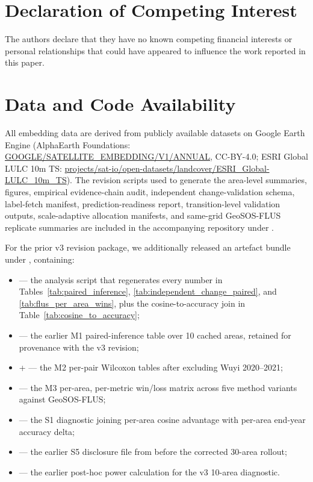 \documentclass{article}
\begin{document}
\section*{Declaration of Competing Interest}
The authors declare that they have no known competing financial interests or personal relationships that could have appeared to influence the work reported in this paper.

\section*{Data and Code Availability}
All embedding data are derived from publicly available datasets on Google Earth Engine (AlphaEarth Foundations: \url{GOOGLE/SATELLITE_EMBEDDING/V1/ANNUAL}, CC-BY-4.0; ESRI Global LULC 10m TS: \url{projects/sat-io/open-datasets/landcover/ESRI_Global-LULC_10m_TS}). The revision scripts used to generate the area-level summaries, figures, empirical evidence-chain audit, independent change-validation schema, label-fetch manifest, prediction-readiness report, transition-level validation outputs, scale-adaptive allocation manifests, and same-grid GeoSOS-FLUS replicate summaries are included in the accompanying repository under .

For the prior v3 revision package, we additionally released an artefact bundle under , containing:
\begin{itemize}
\item {} --- the analysis script that regenerates every number in Tables~\ref{tab:paired_inference}, \ref{tab:independent_change_paired}, and \ref{tab:flus_per_area_wins}, plus the cosine-to-accuracy join in Table~\ref{tab:cosine_to_accuracy};
\item {} --- the earlier M1 paired-inference table over 10 cached areas, retained for provenance with the v3 revision;
\item {} +  --- the M2 per-pair Wilcoxon tables after excluding Wuyi 2020--2021;
\item {} --- the M3 per-area, per-metric win/loss matrix across five method variants against GeoSOS-FLUS;
\item {} --- the S1 diagnostic joining per-area cosine advantage with per-area end-year accuracy delta;
\item {} --- the earlier S5 disclosure file from before the corrected 30-area rollout;
\item {} --- the earlier post-hoc power calculation for the v3 10-area diagnostic.
\end{itemize}
\end{document}
